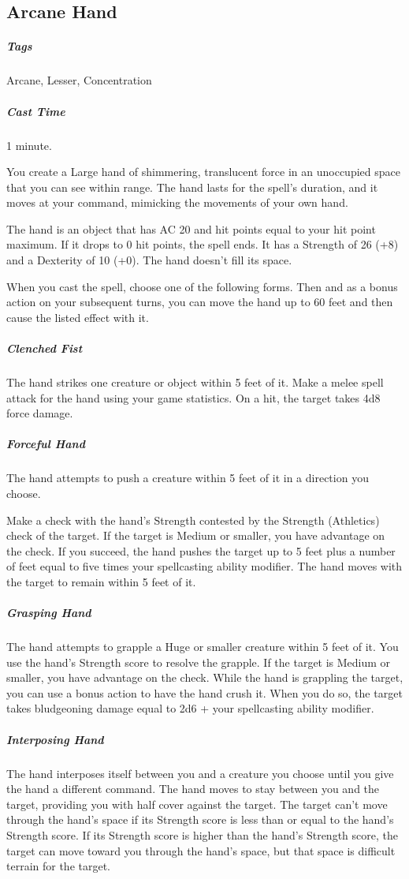 \subsection{Arcane Hand}
\subparagraph*{Tags} Arcane, Lesser, Concentration
\subparagraph*{Cast Time} 1 minute.

You create a Large hand of shimmering, translucent force in an unoccupied space that you can see within range. The hand lasts for the spell's duration, and it moves at your command, mimicking the movements of your own hand.

The hand is an object that has AC 20 and hit points equal to your hit point maximum. If it drops to 0 hit points, the spell ends. It has a Strength of 26 (+8) and a Dexterity of 10 (+0). The hand doesn't fill its space.

When you cast the spell, choose one of the following forms. Then and as a bonus action on your subsequent turns, you can move the hand up to 60 feet and then cause the listed effect with it.

\subparagraph*{Clenched Fist} The hand strikes one creature or object within 5 feet of it. Make a melee spell attack for the hand using your game statistics. On a hit, the target takes 4d8 force damage.

\subparagraph*{Forceful Hand} The hand attempts to push a creature within 5 feet of it in a direction you choose.

Make a check with the hand's Strength contested by the Strength (Athletics) check of the target. If the target is Medium or smaller, you have advantage on the check. If you succeed, the hand pushes the target up to 5 feet plus a number of feet equal to five times your spellcasting ability modifier. The hand moves with the target to remain within 5 feet of it.

\subparagraph*{Grasping Hand} The hand attempts to grapple a Huge or smaller creature within 5 feet of it. You use the hand's Strength score to resolve the grapple. If the target is Medium or smaller, you have advantage on the check. While the hand is grappling the target, you can use a bonus action to have the hand crush it. When you do so, the target takes bludgeoning damage equal to 2d6 + your spellcasting ability modifier.

\subparagraph*{Interposing Hand} The hand interposes itself between you and a creature you choose until you give the hand a different command. The hand moves to stay between you and the target, providing you with half cover against the target. The target can't move through the hand's space if its Strength score is less than or equal to the hand's Strength score. If its Strength score is higher than the hand's Strength score, the target can move toward you through the hand's space, but that space is difficult terrain for the target.

